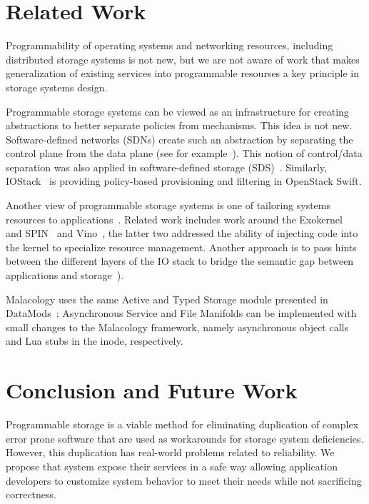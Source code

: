 \documentclass[preprint]{sigplanconf-eurosys}
\begin{document}
\section{Related Work}


Programmability of operating systems and networking resources, including
distributed storage systems is not new, but we are not aware of work that makes
generalization of existing services into programmable resourses a key principle
in storage systems design. 

Programmable storage systems can be viewed as an infrastructure for creating
abstractions to better separate policies from mechanisms. This idea is not new.
Software-defined networks (SDNs) create such an abstraction by separating the
control plane from the data plane (see for example~\cite{jain:sigcomm13}). This
notion of control/data separation was also applied in software-defined storage
(SDS)~\cite{arpaci:sosp01,thereska:sosp13,stefanovici:fast16}. Similarly,
IOStack~\cite{gracia:internet16} is providing policy-based provisioning and
filtering in OpenStack Swift. 

Another view of programmable storage systems is one of tailoring systems
resources to applications~\cite{arpaci:sosp01}. Related work includes work
around the Exokernel~\cite{engler:sosp95} and SPIN~\cite{bershad:sosp95} and
Vino~\cite{seltzer:osdi96}, the latter two addressed the ability of injecting
code into the kernel to specialize resource management. Another approach is to
pass hints between the different layers of the IO stack to bridge the semantic
gap between applications and
storage~\cite{arpaci:sosp01,sivathanu:fast03,mesnier:sosp11}).

Malacology uses the same Active and Typed Storage module presented in
DataMods~\cite{watkins_datamods_2012}; Asynchronous Service and File
Manifolds can be implemented with small changes to the Malacology
framework, namely asynchronous object calls and Lua stubs in the inode,
respectively.

\section{Conclusion and Future Work}\label{conclusion-and-future-work}

Programmable storage is a viable method for eliminating duplication of complex
error prone software that are used as workarounds for storage system
deficiencies. However, this duplication has real-world problems related to
reliability. We propose that system expose their services in a safe way
allowing application developers to customize system behavior to meet their
needs while not sacrificing correctness.
\end{document}
